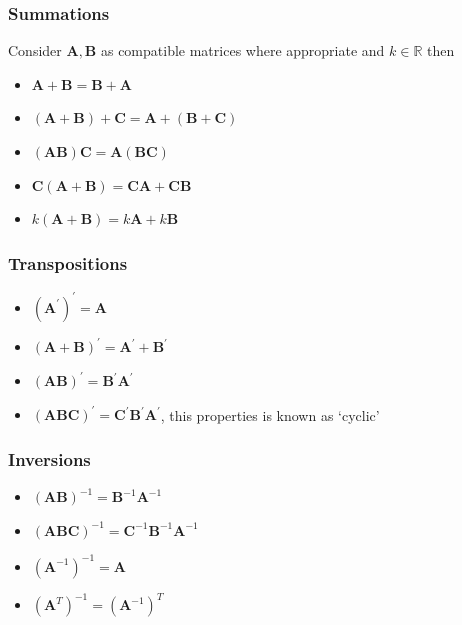 \documentclass[11pt]{article}
\newcommand{\real}{\mathbb{R}}
\begin{document}
\subsubsection{Summations}
Consider $\mathbf{A}, \mathbf{B}$ as compatible matrices where appropriate and $k \in \real$ then
\begin{itemize}
    \item $\mathbf{A}+\mathbf{B}=\mathbf{B}+\mathbf{A}$
    \item $(\mathbf{A}+\mathbf{B})+\mathbf{C}=\mathbf{A}+(\mathbf{B}+\mathbf{C})$
    \item $(\mathbf{A B}) \mathbf{C}=\mathbf{A}(\mathbf{B C})$
    \item $\mathbf{C}(\mathbf{A}+\mathbf{B})=\mathbf{C} \mathbf{A}+\mathbf{C B}$
    \item $k(\mathbf{A}+\mathbf{B})=k \mathbf{A}+k \mathbf{B}$
\end{itemize}
\subsubsection{Transpositions}
\begin{itemize}
    \item $\left(\mathbf{A}^{\prime}\right)^{\prime}=\mathbf{A}$
    \item $(\mathbf{A}+\mathbf{B})^{\prime}=\mathbf{A}^{\prime}+\mathbf{B}^{\prime}$
    \item $(\mathbf{A B})^{\prime}=\mathbf{B}^{\prime} \mathbf{A}^{\prime}$
    \item $(\mathbf{A B C})^{\prime}=\mathbf{C}^{\prime} \mathbf{B}^{\prime} \mathbf{A}^{\prime}$, this properties is known as `cyclic'
\end{itemize}
\subsubsection{Inversions}
\begin{itemize}
    \item $(\mathbf{A B})^{-1}=\mathbf{B}^{-1} \mathbf{A}^{-1}$
    \item $(\mathbf{A B C})^{-1}=\mathbf{C}^{-1} \mathbf{B}^{-1} \mathbf{A}^{-1}$
    \item $\left(\mathbf{A}^{-1}\right)^{-1}=\mathbf{A}$
    \item $\left(\mathbf{A}^{T}\right)^{-1}=\left(\mathbf{A}^{-1}\right)^{T}$
\end{itemize}
\end{document}

